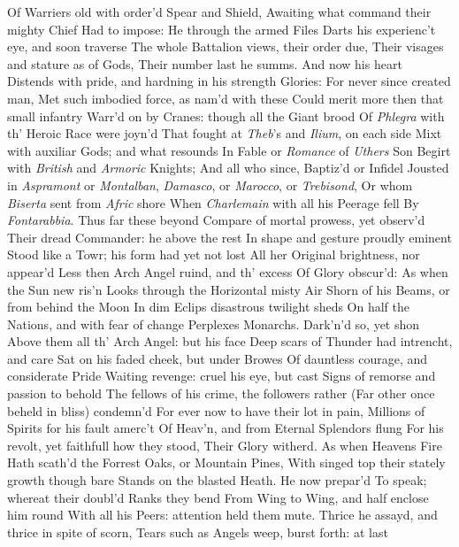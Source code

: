 \documentclass[11pt]{book}
\newcounter {last}
\begin{document}
Of Warriers old with order'd Spear and Shield, 
Awaiting what command their mighty Chief 
Had to impose: He through the armed Files 
Darts his experienc't eye, and soon traverse 
The whole Battalion views, their order due, 
Their visages and stature as of Gods, 
Their number last he summs.  And now his heart 
Distends with pride, and hardning in his strength 
Glories: For never since created man, 
Met such imbodied force, as nam'd with these 
Could merit more then that small infantry 
Warr'd on by Cranes: though all the Giant brood 
Of \textit{Phlegra} with th' Heroic Race were joyn'd 
That fought at \textit{Theb}'s and \textit{Ilium}, on each side 
Mixt with auxiliar Gods; and what resounds 
In Fable or \textit{Romance} of \textit{Uthers} Son 
Begirt with \textit{British} and \textit{Armoric} Knights; 
And all who since, Baptiz'd or Infidel 
Jousted in \textit{Aspramont} or \textit{Montalban}, 
\textit{Damasco}, or \textit{Marocco}, or \textit{Trebisond}, 
Or whom \textit{Biserta} sent from \textit{Afric} shore 
When \textit{Charlemain} with all his Peerage fell 
By \textit{Fontarabbia}.  Thus far these beyond 
Compare of mortal prowess, yet observ'd 
Their dread Commander: he above the rest 
In shape and gesture proudly eminent 
Stood like a Towr; his form had yet not lost 
All her Original brightness, nor appear'd 
Less then Arch Angel ruind, and th' excess 
Of Glory obscur'd: As when the Sun new ris'n 
Looks through the Horizontal misty Air 
Shorn of his Beams, or from behind the Moon 
In dim Eclips disastrous twilight sheds 
On half the Nations, and with fear of change 
Perplexes Monarchs.  Dark'n'd so, yet shon 
Above them all th' Arch Angel: but his face 
Deep scars of Thunder had intrencht, and care 
Sat on his faded cheek, but under Browes 
Of dauntless courage, and considerate Pride 
Waiting revenge: cruel his eye, but cast 
Signs of remorse and passion to behold 
The fellows of his crime, the followers rather 
(Far other once beheld in bliss) condemn'd 
For ever now to have their lot in pain, 
Millions of Spirits for his fault amerc't 
Of Heav'n, and from Eternal Splendors flung 
For his revolt, yet faithfull how they stood, 
Their Glory witherd.  As when Heavens Fire 
Hath scath'd the Forrest Oaks, or Mountain Pines, 
With singed top their stately growth though bare 
Stands on the blasted Heath.  He now prepar'd 
To speak; whereat their doubl'd Ranks they bend 
From Wing to Wing, and half enclose him round 
With all his Peers: attention held them mute. 
Thrice he assayd, and thrice in spite of scorn, 
Tears such as Angels weep, burst forth: at last 
\end{document}
